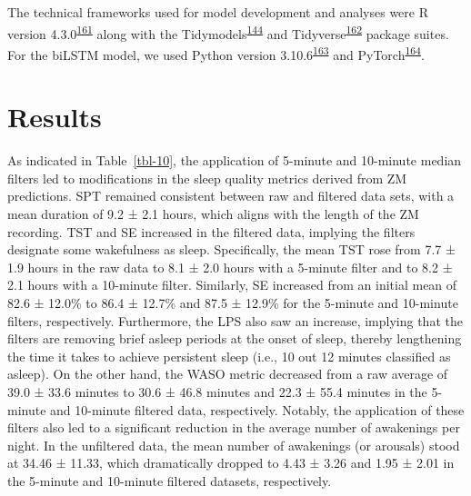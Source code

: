 \documentclass[
  10pt,
]{scrbook}
\begin{document}
The technical frameworks used for model development and analyses were R
version
4.3.0\textsuperscript{\protect\hyperlink{ref-rcoreteam_2023}{161}} along
with the
Tidymodels\textsuperscript{\protect\hyperlink{ref-kuhn_tidymodels_2020}{144}}
and
Tidyverse\textsuperscript{\protect\hyperlink{ref-wickham_tidyverse_2019}{162}}
package suites. For the biLSTM model, we used Python version
3.10.6\textsuperscript{\protect\hyperlink{ref-vanrossum_python_2009}{163}}
and
PyTorch\textsuperscript{\protect\hyperlink{ref-paszke_pytorch_2019}{164}}.

\hypertarget{results-2}{%
\section{Results}\label{results-2}}

As indicated in Table~\ref{tbl-10}, the application of 5-minute and
10-minute median filters led to modifications in the sleep quality
metrics derived from ZM predictions. SPT remained consistent between raw
and filtered data sets, with a mean duration of 9.2 ± 2.1 hours, which
aligns with the length of the ZM recording. TST and SE increased in the
filtered data, implying the filters designate some wakefulness as sleep.
Specifically, the mean TST rose from 7.7 ± 1.9 hours in the raw data to
8.1 ± 2.0 hours with a 5-minute filter and to 8.2 ± 2.1 hours with a
10-minute filter. Similarly, SE increased from an initial mean of 82.6 ±
12.0\% to 86.4 ± 12.7\% and 87.5 ± 12.9\% for the 5-minute and 10-minute
filters, respectively. Furthermore, the LPS also saw an increase,
implying that the filters are removing brief asleep periods at the onset
of sleep, thereby lengthening the time it takes to achieve persistent
sleep (i.e., 10 out 12 minutes classified as asleep). On the other hand,
the WASO metric decreased from a raw average of 39.0 ± 33.6 minutes to
30.6 ± 46.8 minutes and 22.3 ± 55.4 minutes in the 5-minute and
10-minute filtered data, respectively. Notably, the application of these
filters also led to a significant reduction in the average number of
awakenings per night. In the unfiltered data, the mean number of
awakenings (or arousals) stood at 34.46 ± 11.33, which dramatically
dropped to 4.43 ± 3.26 and 1.95 ± 2.01 in the 5-minute and 10-minute
filtered datasets, respectively.

\begingroup

\footnotesize
\end{document}
